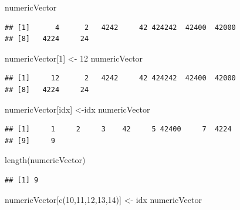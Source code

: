 \documentclass[
]{book}
\newenvironment{Shaded}{\begin{snugshade}}{\end{snugshade}}
\newcommand{\DecValTok}[1]{\textcolor[rgb]{0.00,0.00,0.81}{#1}}
\newcommand{\FunctionTok}[1]{\textcolor[rgb]{0.00,0.00,0.00}{#1}}
\newcommand{\NormalTok}[1]{#1}
\newcommand{\OtherTok}[1]{\textcolor[rgb]{0.56,0.35,0.01}{#1}}
\begin{document}
\begin{Shaded}
\begin{Highlighting}[]
\NormalTok{numericVector}
\end{Highlighting}
\end{Shaded}

\begin{verbatim}
## [1]      4      2   4242     42 424242  42400  42000
## [8]   4224     24
\end{verbatim}

\begin{Shaded}
\begin{Highlighting}[]
\NormalTok{numericVector[}\DecValTok{1}\NormalTok{] }\OtherTok{\textless{}{-}} \DecValTok{12}
\NormalTok{numericVector}
\end{Highlighting}
\end{Shaded}

\begin{verbatim}
## [1]     12      2   4242     42 424242  42400  42000
## [8]   4224     24
\end{verbatim}

\begin{Shaded}
\begin{Highlighting}[]
\NormalTok{numericVector[idx] }\OtherTok{\textless{}{-}}\NormalTok{idx}
\NormalTok{numericVector}
\end{Highlighting}
\end{Shaded}

\begin{verbatim}
## [1]     1     2     3    42     5 42400     7  4224
## [9]     9
\end{verbatim}

\begin{Shaded}
\begin{Highlighting}[]
\FunctionTok{length}\NormalTok{(numericVector)}
\end{Highlighting}
\end{Shaded}

\begin{verbatim}
## [1] 9
\end{verbatim}

\begin{Shaded}
\begin{Highlighting}[]
\NormalTok{numericVector[}\FunctionTok{c}\NormalTok{(}\DecValTok{10}\NormalTok{,}\DecValTok{11}\NormalTok{,}\DecValTok{12}\NormalTok{,}\DecValTok{13}\NormalTok{,}\DecValTok{14}\NormalTok{)] }\OtherTok{\textless{}{-}}\NormalTok{ idx}
\NormalTok{numericVector}
\end{Highlighting}
\end{Shaded}
\end{document}
